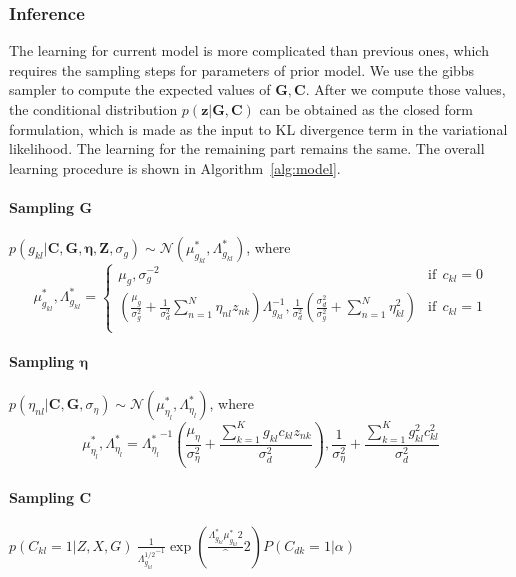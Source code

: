 \subsubsection{Inference}
The learning for current model is more complicated than previous ones, which requires the sampling steps for parameters of prior model. We use the gibbs sampler to compute the expected values of $\mathbf{G}, \mathbf{C}$. After we compute those values, the conditional distribution $p(\mathbf{z}|\mathbf{G},\mathbf{C})$ can be obtained as the closed form formulation, which is made as the input to KL divergence term in the variational likelihood. The learning for the remaining part remains the same. The overall learning procedure is shown in Algorithm~\ref{alg:model}.

\paragraph{Sampling $\mathbf{G}$} $p(g_{kl}|\mathbf{C},\mathbf{G},\mathbf{\eta}, \mathbf{Z},\sigma_g)\sim \mathcal{N}(\mu_{g_{kl}}^*, \Lambda_{g_{kl}}^*)$, where
\[ \mu_{g_{kl}}^*, \Lambda_{g_{kl}}^* =
  \begin{cases}
     \mu_g, \sigma_g^{-2}      & \text{if} ~~c_{kl} = 0\\
    \left(\frac{\mu_g}{\sigma_g^2}+\frac{1}{\sigma_d^2}\sum_{n=1}^{N}\eta_{nl}z_{nk}\right)\Lambda_{g_{kl}}^{-1}, \frac{1}{\sigma_d^2}\left(\frac{\sigma_d^2}{\sigma_g^2}+\sum_{n=1}^{N}\eta_{kl}^2\right)  & \text{if}~~ c_{kl} = 1\\
  \end{cases}
\]
\paragraph{Sampling $\mathbf{\eta}$} $p(\eta_{nl}|\mathbf{C},\mathbf{G},\sigma_{\eta})\sim \mathcal{N}(\mu_{\eta_l}^*, \Lambda_{\eta_{l}}^*)$, where
\[
\mu_{\eta_l}^*, \Lambda_{\eta_{l}}^*={\Lambda_{\eta_l}^*}^{-1}\left(\frac{\mu_\eta}{\sigma_{\eta}^2}+\frac{\sum_{k=1}^{K}g_{kl}c_{kl}z_{nk}}{\sigma_d^2}\right),
\frac{1}{\sigma_{\eta}^2}+\frac{\sum_{k=1}^{K}g_{kl}^2c_{kl}^2}{\sigma_d^2}
\]
\paragraph{Sampling $\mathbf{C}$} $p(C_{kl}=1|Z, X, G) ~ \frac{1}{{\Lambda_{g_{kl}}^{1/2}}^{-1}}\exp(\frac{\Lambda_{g_{kl}}^{\ast}{\mu_{g_{kl}}^{\ast}}{2}}^2)P(C_{dk}=1|\alpha)$ 

